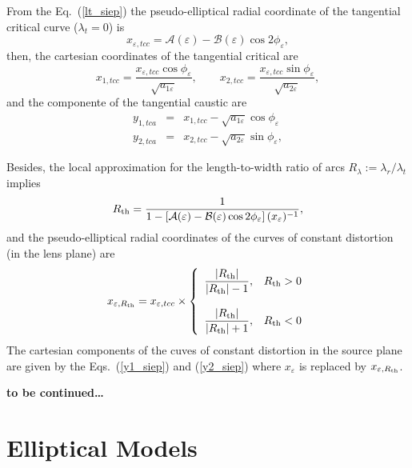 From the Eq.~(\ref{lt_siep}) the pseudo-elliptical radial coordinate of the tangential critical curve  ($\lambda_t=0$) is
\begin{equation}
x_{\varepsilon,tcc}= \mathcal{A}(\varepsilon)-\mathcal{B}(\varepsilon)\cos{2\phi_\varepsilon}, 
\end{equation}
then, the cartesian coordinates of the tangential critical are
\begin{equation}
x_{1,tcc}=\dfrac{x_{\varepsilon,tcc}\cos{\phi_\varepsilon}}{\sqrt{a_{1\varepsilon}}},\qquad x_{2,tcc}=\dfrac{x_{\varepsilon,tcc}\sin{\phi_\varepsilon}}{\sqrt{a_{2\varepsilon}}},
\end{equation}
and the componente of the tangential caustic are
\begin{eqnarray}
y_{1,tca} &=&x_{1,tcc}-\sqrt{a_{1\varepsilon}}\cos{\phi_ \varepsilon}\\
y_{2,tca} &=&x_{2,tcc}-\sqrt{a_{2\varepsilon}}\sin{\phi_ \varepsilon},
\end{eqnarray}

Besides, the local approximation for the length-to-width ratio of arcs $R_\lambda:=\lambda_r/\lambda_t$ implies
\begin{equation}
R_{\rm th}=\dfrac{1}{1-\left[\mathcal{A}(\varepsilon)-\mathcal{B}(\varepsilon)\cos{2\phi_\varepsilon } \right](x_\varepsilon)^{-1}},
\end{equation}
and the pseudo-elliptical radial coordinates of the curves of constant distortion (in the lens plane) are
\begin{equation}
x_{\varepsilon,R_{\rm th}}=x_{\varepsilon,tcc}\times\left\{\begin{array}{cc} \dfrac{|R_{\rm th}|}{|R_{\rm th}|-1}, & R_{\rm th}>0 \\ & \\
\dfrac{|R_{\rm th}|}{|R_{\rm th}|+1}, & R_{\rm th}<0 \end{array}\right.
\end{equation}
The cartesian components of the cuves of constant distortion in the source plane are given by the Eqs.~(\ref{y1_siep}) and (\ref{y2_siep}) where $x_\varepsilon$ is replaced by $x_{\varepsilon,R_{\rm th}}$.

{\bf to be continued\ldots}
\section{Elliptical Models}
